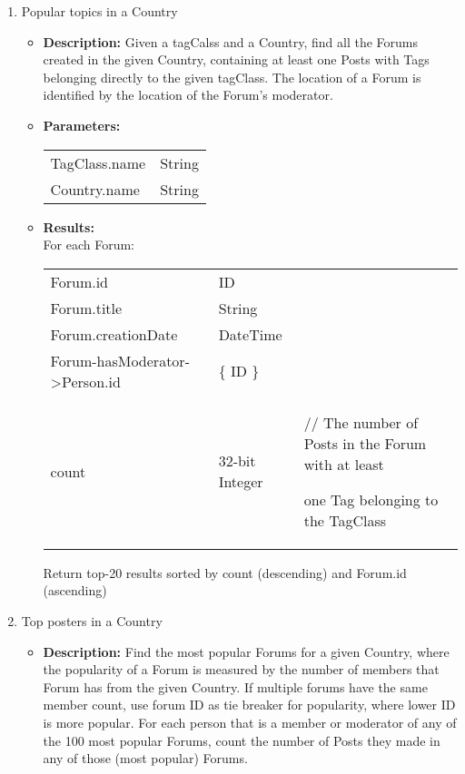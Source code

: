 {\begin{enumerate}
      \item Popular topics in a Country 
            \begin{itemize}
                \item \textbf{Description:}
                  Given a tagCalss and a Country, find all the Forums created in the given Country, containing at least
                  one Posts with Tags belonging directly to the given tagClass.
                  The location of a Forum is identified by the location of the Forum’s moderator.
                \item \textbf{Parameters:} \\
                    \begin{tabular}{ll}
                      TagClass.name & String \\
                      Country.name & String \\
                    \end{tabular}
                \item \textbf{Results:} \\
                  For each Forum:
                    \begin{tabular}{lll}
                      Forum.id  & ID & \\
                      Forum.title & String & \\
                      Forum.creationDate & DateTime & \\
                      Forum-hasModerator->Person.id & \{ ID \} & \\
                      count & 32-bit Integer &  \parbox[t]{20cm}{ // The number of Posts in the Forum with at least \par one Tag belonging to
                        the TagClass \strut} 
                    \end{tabular}
                    Return top-20 results sorted by count (descending) and Forum.id (ascending)
                    \end{itemize}

      \item Top posters in a Country 
            \begin{itemize}
                \item \textbf{Description:}
                  Find the most popular Forums for a given Country, where the popularity of a Forum is measured by the
                  number of members that Forum has from the given Country.  If multiple forums have the same member
                  count, use forum ID as tie breaker for popularity, where lower ID is more popular.  For each person
                  that is a member or moderator of any of the 100 most popular Forums, count the number of Posts they
                  made in any of those (most popular) Forums.


\end{itemize}
\end{enumerate}}
